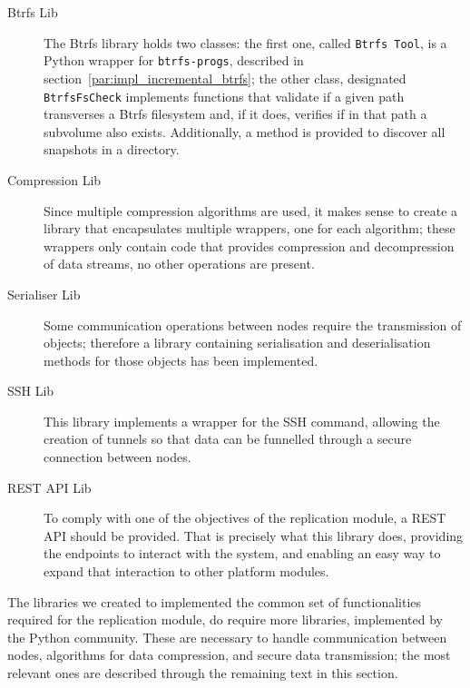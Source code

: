 \begin{description}
	\item [Btrfs Lib] The Btrfs library holds two classes: the first one, called \texttt{Btrfs Tool}, is a Python wrapper for \texttt{btrfs-progs}, described in section~\ref{par:impl_incremental_btrfs}; the other class, designated \texttt{BtrfsFsCheck} implements functions that validate if a given path transverses a Btrfs filesystem and, if it does, verifies if in that path a subvolume also exists. Additionally, a method is provided to discover all snapshots in a directory.
	\item [Compression Lib] Since multiple compression algorithms are used, it makes sense to create a library that encapsulates multiple wrappers, one for each algorithm; these wrappers only contain code that provides compression and decompression of data streams, no other operations are present.
	\item [Serialiser Lib] Some communication operations between nodes require the transmission of objects; therefore a library containing serialisation and deserialisation methods for those objects has been implemented.
	\item [SSH Lib] This library implements a wrapper for the SSH command, allowing the creation of tunnels so that data can be funnelled through a secure connection between nodes.
	\item [REST API Lib] To comply with one of the objectives of the replication module, a REST API should be provided. That is precisely what this library does, providing the endpoints to interact with the system, and enabling an easy way to expand that interaction to other platform modules.
\end{description}


The libraries we created to implemented the common set of functionalities required for the replication module, do require more libraries, implemented by the Python community. These are necessary to handle communication between nodes, algorithms for data compression, and secure data transmission; the most relevant ones are described through the remaining text in this section.

